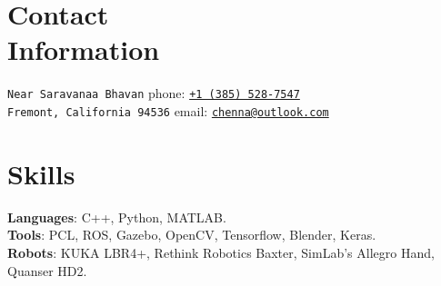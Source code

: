 \documentclass[letterpaper, margin, line, 10.5pt]{resume}
\begin{document}
\author{Kautilya Chenna}

\begin{resume}

    
    \section{\myheadingstyle Contact \\ Information}

    \texttt{Near Saravanaa Bhavan}                            \hfill phone: \texttt{\href{tel:13855287547}{+1 (385) 528-7547}}          \vspace{0mm}\\\vspace{0mm}%
    \texttt{Fremont, California 94536}                          \hfill email: \texttt{\href{mailto:chenna@outlook.com}{chenna@outlook.com}}       %


    
	\sectionseperator
	\section{\myheadingstyle Skills} 
	
	\textbf{Languages}: C++, Python, MATLAB. \\[1mm]
	\textbf{Tools}: PCL, ROS, Gazebo, OpenCV, Tensorflow, Blender, Keras. \\[1mm]
	\textbf{Robots}: KUKA LBR4+, Rethink Robotics Baxter, SimLab's Allegro Hand, Quanser HD2.%


    
    \sectionseperator

\end{resume}
\end{document}
